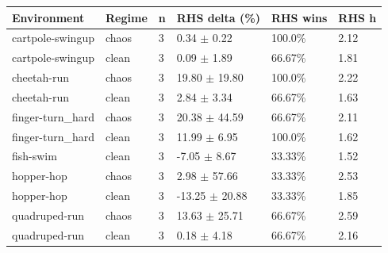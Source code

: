 \begin{tabular}{llllll}
\toprule
Environment & Regime & n & RHS delta (\%) & RHS wins & RHS h \\
\midrule
cartpole-swingup & chaos & 3 & 0.34 $\pm$ 0.22 & 100.0\% & 2.12 \\
cartpole-swingup & clean & 3 & 0.09 $\pm$ 1.89 & 66.67\% & 1.81 \\
cheetah-run & chaos & 3 & 19.80 $\pm$ 19.80 & 100.0\% & 2.22 \\
cheetah-run & clean & 3 & 2.84 $\pm$ 3.34 & 66.67\% & 1.63 \\
finger-turn\_hard & chaos & 3 & 20.38 $\pm$ 44.59 & 66.67\% & 2.11 \\
finger-turn\_hard & clean & 3 & 11.99 $\pm$ 6.95 & 100.0\% & 1.62 \\
fish-swim & clean & 3 & -7.05 $\pm$ 8.67 & 33.33\% & 1.52 \\
hopper-hop & chaos & 3 & 2.98 $\pm$ 57.66 & 33.33\% & 2.53 \\
hopper-hop & clean & 3 & -13.25 $\pm$ 20.88 & 33.33\% & 1.85 \\
quadruped-run & chaos & 3 & 13.63 $\pm$ 25.71 & 66.67\% & 2.59 \\
quadruped-run & clean & 3 & 0.18 $\pm$ 4.18 & 66.67\% & 2.16 \\
\bottomrule
\end{tabular}
